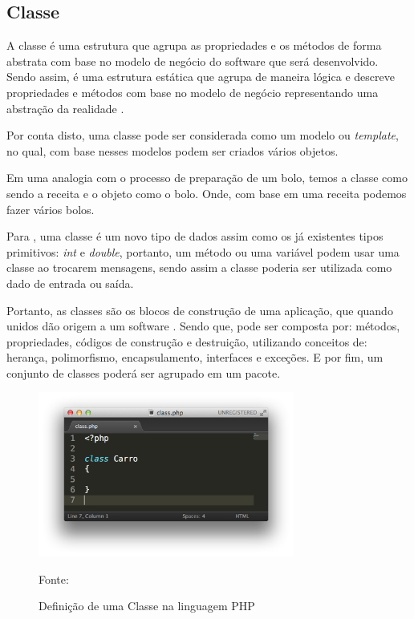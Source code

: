 \subsection{Classe}

A classe é uma estrutura que agrupa as propriedades e os métodos de forma
abstrata com base no modelo de negócio do software que será desenvolvido.
Sendo assim, é uma estrutura estática que agrupa de maneira lógica e descreve
propriedades e métodos com base no modelo de negócio representando uma abstração
da realidade \cite{phpProgramandoComOrientacaoAObjetos}.

Por conta disto, uma classe pode ser considerada como um modelo ou
\textit{template}, no qual, com base nesses modelos podem ser criados vários objetos.

Em uma analogia com o processo de preparação de um bolo, temos a classe como
sendo a receita e o objeto como o bolo. Onde, com base em uma receita podemos fazer
vários bolos.

Para , uma classe é um novo tipo de dados assim como os já
existentes tipos primitivos: \textit{int} e \textit{double}, portanto, um método
ou uma variável podem usar uma classe ao trocarem mensagens, sendo assim a classe
poderia ser utilizada como dado de entrada ou saída.

Portanto, as classes são os blocos de construção de uma aplicação, que quando
unidos dão origem a um software \cite{learningJava}. Sendo que, pode ser
composta por: métodos, propriedades, códigos de construção e destruição,
utilizando conceitos de: herança, polimorfismo, encapsulamento, interfaces e
exceções. E por fim, um conjunto de classes poderá ser agrupado em um pacote.

\begin{figure}[h!tb]
	\caption{Definição de uma Classe na linguagem PHP}
	\label{fig:classe}

	\centering
	\includegraphics[width=0.75\textwidth]{images/class.png}

	\centering
	\footnotesize Fonte: \fonteOAutor
\end{figure}

